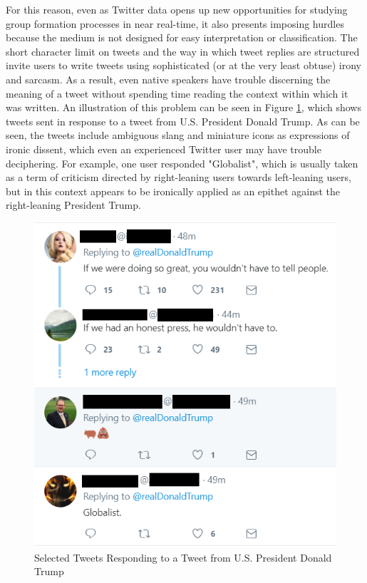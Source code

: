 \documentclass[12pt]{article}
\begin{document}
For this reason, even as Twitter data opens up new opportunities for studying group formation processes in near real-time, it also presents imposing hurdles because the medium is not designed for easy interpretation or classification. The short character limit on tweets and the way in which tweet replies are structured invite users to write tweets using sophisticated (or at the very least obtuse) irony and sarcasm. As a result, even native speakers have trouble discerning the meaning of a tweet without spending time reading the context within which it was written. An illustration of this problem can be seen in Figure \ref{trump_tweet}, which shows tweets sent in response to a tweet from U.S. President Donald Trump. As can be seen, the tweets include ambiguous slang and miniature icons as expressions of ironic dissent, which even an experienced Twitter user may have trouble deciphering. For example, one user responded "Globalist", which is usually taken as a term of criticism directed by right-leaning users towards left-leaning users, but in this context appears to be ironically applied as an epithet against the right-leaning President Trump. 
\begin{figure}
	\centering
	\caption{Selected Tweets Responding to a Tweet from U.S. President Donald Trump}\label{trump_tweet}
	\includegraphics[width=.7\linewidth]{trump_tweets}
\end{figure}
\end{document}
